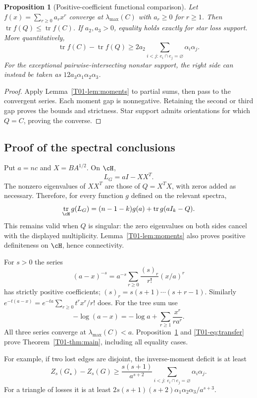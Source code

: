 \documentclass[11pt,a4paper]{article}
\newtheorem{proposition}[theorem]{Proposition}
\theoremstyle{definition}\newtheorem{definition}[theorem]{Definition}
\theoremstyle{remark}\newtheorem{remark}[theorem]{Remark}
\DeclareMathOperator{\tr}{tr}\DeclareMathOperator{\supp}{supp}\DeclareMathOperator{\TV}{TV}
\numberwithin{equation}{section}
\begin{document}
\begin{proposition}[Positive-coefficient functional comparison]\label{T01-prop:function}
Let $f(x)=\sum_{r\ge0}a_rx^r$ converge at $\lambda_{\max}(C)$ with $a_r\ge0$ for $r\ge1$. Then $\tr f(Q)\le\tr f(C)$. If $a_2,a_3>0$, equality holds exactly for star loss support. More quantitatively,
\begin{equation}\label{T01-eq:quant}
 \tr f(C)-\tr f(Q)\ge
 2a_2\sum_{i<j:\,e_i\cap e_j=\varnothing}\alpha_i\alpha_j.
\end{equation}
For the exceptional pairwise-intersecting nonstar support, the right side can instead be taken as $12a_3\alpha_1\alpha_2\alpha_3$.
\end{proposition}
\begin{proof}
Apply Lemma~\ref{T01-lem:moments} to partial sums, then pass to the convergent series. Each moment gap is nonnegative. Retaining the second or third gap proves the bounds and strictness. Star support admits orientations for which $Q=C$, proving the converse.
\end{proof}

\subsection{Proof of the spectral conclusions}\label{T01-sec-3}
Put $a=nc$ and $X=BA^{1/2}$. On $\cH$,
\[
 L_G=aI-XX^T.
\]
The nonzero eigenvalues of $XX^T$ are those of $Q=X^TX$, with zeros added as necessary. Therefore, for every function $g$ defined on the relevant spectra,
\begin{equation}\label{T01-eq:transfer}
 \tr_{\cH}g(L_G)=(n-1-k)g(a)+\tr g(aI_k-Q).
\end{equation}
This remains valid when $Q$ is singular: the zero eigenvalues on both sides cancel with the displayed multiplicity. Lemma~\ref{T01-lem:moments} also proves positive definiteness on $\cH$, hence connectivity.

For $s>0$ the series
\[
 (a-x)^{-s}=a^{-s}\sum_{r\ge0}\frac{(s)_r}{r!}(x/a)^r
\]
has strictly positive coefficients; $(s)_r=s(s+1)\cdots(s+r-1)$. Similarly $e^{-t(a-x)}=e^{-ta}\sum_{r\ge0}t^rx^r/r!$ does. For the tree sum use
\[
 -\log(a-x)=-\log a+\sum_{r\ge1}\frac{x^r}{ra^r}.
\]
All three series converge at $\lambda_{\max}(C)<a$. Proposition~\ref{T01-prop:function} and \eqref{T01-eq:transfer} prove Theorem~\ref{T01-thm:main}, including all equality cases.

For example, if two lost edges are disjoint, the inverse-moment deficit is at least
\[
 Z_s(G_\star)-Z_s(G)\ge
 \frac{s(s+1)}{a^{s+2}}
 \sum_{i<j:\,e_i\cap e_j=\varnothing}\alpha_i\alpha_j.
\]
For a triangle of losses it is at least
$2s(s+1)(s+2)\alpha_1\alpha_2\alpha_3/a^{s+3}$.
\end{document}
